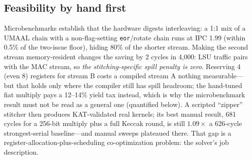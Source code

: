 \documentclass[11pt,a4paper]{article}
\begin{document}
\subsection{Feasibility by hand first}
Microbenchmarks establish that the hardware digests interleaving: a 1:1 mix of a
UMAAL chain with a non-flag-setting \texttt{eor}/rotate chain runs at IPC 1.99
(within 0.5\% of the two-issue floor), hiding 80\% of the shorter stream.
Making the second stream memory-resident changes the saving by 2 cycles in
4,000: LSU traffic pairs with the MAC stream, so \emph{the stitching-specific
spill penalty is zero}. Reserving 4 (even 8) registers for stream B costs a
compiled stream A nothing measurable---but that holds only where the compiler
still has spill headroom; the hand-tuned fiat multiply pays a 12--14\% yield tax
instead, which is why the microbenchmark result must not be read as a general
one (quantified below). A scripted ``zipper'' stitcher then
produces KAT-validated real kernels; its best manual result, 681 cycles for a
256-bit multiply plus a full Keccak round, is still $1.09\times$ a
626-cycle strongest-serial baseline---and manual sweeps plateaued there. That
gap is a register-allocation-plus-scheduling co-optimization problem: the
solver's job description.
\end{document}
